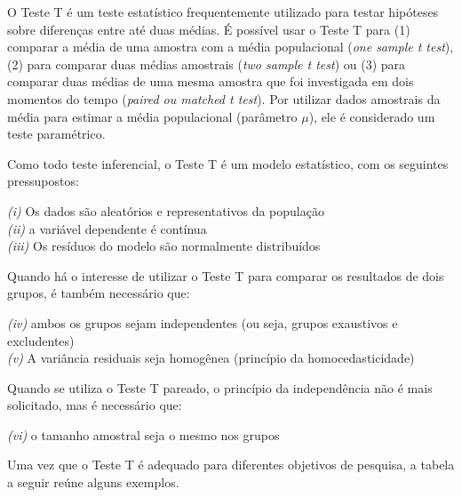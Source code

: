 \documentclass[
]{book}
\begin{document}
O Teste T é um teste estatístico frequentemente utilizado para testar
hipóteses sobre diferenças entre até duas médias. É possível usar o
Teste T para (1) comparar a média de uma amostra com a média
populacional (\emph{one sample t test}), (2) para comparar duas médias
amostrais (\emph{two sample t test}) ou (3) para comparar duas médias de
uma mesma amostra que foi investigada em dois momentos do tempo
(\emph{paired ou matched t test}). Por utilizar dados amostrais da média
para estimar a média populacional (parâmetro \(\mu\)), ele é considerado
um teste paramétrico.

Como todo teste inferencial, o Teste T é um modelo estatístico, com os
seguintes pressupostos:

\emph{(i)} Os dados são aleatórios e representativos da população\\
\emph{(ii)} a variável dependente é contínua\\
\emph{(iii)} Os resíduos do modelo são normalmente distribuídos

Quando há o interesse de utilizar o Teste T para comparar os resultados
de dois grupos, é também necessário que:

\emph{(iv)} ambos os grupos sejam independentes (ou seja, grupos
exaustivos e excludentes)\\
\emph{(v)} A variância residuais seja homogênea (princípio da
homocedasticidade)

Quando se utiliza o Teste T pareado, o princípio da independência não é
mais solicitado, mas é necessário que:

\emph{(vi)} o tamanho amostral seja o mesmo nos grupos

Uma vez que o Teste T é adequado para diferentes objetivos de pesquisa,
a tabela a seguir reúne alguns exemplos.
\end{document}

